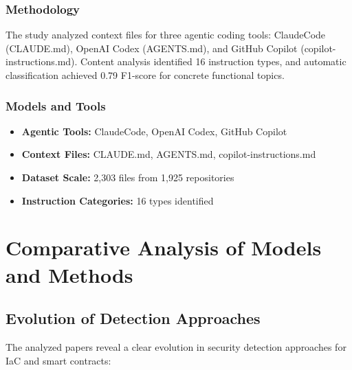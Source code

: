 \documentclass[11pt,a4paper]{article}
\begin{document}
\subsubsection{Methodology}
The study analyzed context files for three agentic coding tools: ClaudeCode (CLAUDE.md), OpenAI Codex (AGENTS.md), and GitHub Copilot (copilot-instructions.md). Content analysis identified 16 instruction types, and automatic classification achieved 0.79 F1-score for concrete functional topics.

\subsubsection{Models and Tools}
\begin{itemize}
    \item \textbf{Agentic Tools:} ClaudeCode, OpenAI Codex, GitHub Copilot
    \item \textbf{Context Files:} CLAUDE.md, AGENTS.md, copilot-instructions.md
    \item \textbf{Dataset Scale:} 2,303 files from 1,925 repositories
    \item \textbf{Instruction Categories:} 16 types identified
\end{itemize}

\section{Comparative Analysis of Models and Methods}

\subsection{Evolution of Detection Approaches}

The analyzed papers reveal a clear evolution in security detection approaches for IaC and smart contracts:
\end{document}
